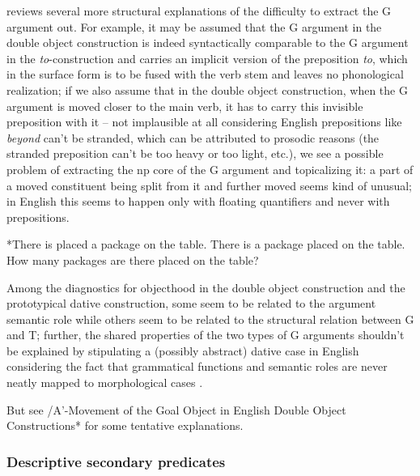 \documentclass[UTF8, a4paper, oneside, scheme=plain, 12pt]{ctexbook}
\newcommand{\form}[1]{\emph{#1}}
\begin{document}
\citet{baker1997thematic} reviews several more structural explanations 
of the difficulty to extract the G argument out.
For example, it may be assumed that the G argument in the double object construction
is indeed syntactically comparable to the G argument in the \form{to}-construction and 
carries an implicit version of the preposition \form{to}, 
which in the surface form is to be fused with the verb stem 
and leaves no phonological realization; 
if we also assume that in the double object construction,
when the G argument is moved closer to the main verb, 
it has to carry this invisible preposition with it 
-- not implausible at all considering English prepositions like \form{beyond} can't be stranded, 
which can be attributed to prosodic reasons 
(the stranded preposition can't be too heavy or too light, etc.), 
we see a possible problem of extracting the \acs{np} core of the G argument and topicalizing it: 
a part of a moved constituent being split from it and further moved seems kind of unusual; 
in English this seems to happen only with floating quantifiers
and never with prepositions.

\begin{exe}
    \ex \begin{xlist}
        \ex\label{ex:clause.dative.extraction.explanation.1.1} *There is placed a package on the table.
        \ex There is a package placed on the table.
        \ex *How many packages are there placed on the table?
    \end{xlist}
\end{exe}

Among the diagnostics for objecthood in the double object construction and the prototypical dative construction, 
some seem to be related to the argument semantic role 
while others seem to be related to the structural relation between G and T; 
further, the shared properties of the two types of G arguments
shouldn't be explained by stipulating a (possibly abstract) dative case in English 
considering the fact that grammatical functions and semantic roles are never neatly 
mapped to morphological cases \citep{maling2001dative}.

But see /A'-Movement  of  the  Goal  Object  in  English Double  Object  Constructions*  for some tentative explanations.

\subsubsection{Descriptive secondary predicates}
\end{document}
